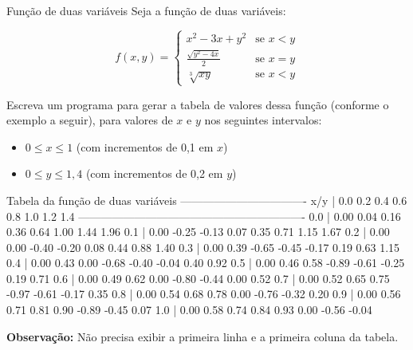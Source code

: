 \documentclass[11pt]{practice}
\begin{document}
\begin{task}[breakable]{Função de duas variáveis}{}
  Seja a função de duas variáveis:

  \[ 
  f(x,y) =
    \begin{cases}
      x^2 - 3x + y^2  & \text{se $x < y$}\\
      \frac{\sqrt{y^2 - 4x}}{2}  & \text{se $x = y$}\\
      \sqrt[3]{xy}  & \text{se $x < y$}
    \end{cases}
  \]

  Escreva um programa para gerar a tabela de valores dessa função
  (conforme o exemplo a seguir), para valores de $x$ e $y$ nos seguintes
  intervalos:
  \begin{itemize}
    \item $0 \leq x \leq 1$ (com incrementos de 0,1 em $x$)
    \item $0 \leq y \leq 1,4$ (com incrementos de 0,2 em $y$)
  \end{itemize}

  \begin{runexample}
Tabela da função de duas variáveis
----------------------------------
x/y |    0.0    0.2    0.4    0.6    0.8    1.0    1.2    1.4
-------------------------------------------------------------
0.0 |   0.00   0.04   0.16   0.36   0.64   1.00   1.44   1.96
0.1 |   0.00  -0.25  -0.13   0.07   0.35   0.71   1.15   1.67
0.2 |   0.00   0.00  -0.40  -0.20   0.08   0.44   0.88   1.40
0.3 |   0.00   0.39  -0.65  -0.45  -0.17   0.19   0.63   1.15
0.4 |   0.00   0.43   0.00  -0.68  -0.40  -0.04   0.40   0.92
0.5 |   0.00   0.46   0.58  -0.89  -0.61  -0.25   0.19   0.71
0.6 |   0.00   0.49   0.62   0.00  -0.80  -0.44   0.00   0.52
0.7 |   0.00   0.52   0.65   0.75  -0.97  -0.61  -0.17   0.35
0.8 |   0.00   0.54   0.68   0.78   0.00  -0.76  -0.32   0.20
0.9 |   0.00   0.56   0.71   0.81   0.90  -0.89  -0.45   0.07
1.0 |   0.00   0.58   0.74   0.84   0.93   0.00  -0.56  -0.04
  \end{runexample}

  \textbf{Observação:} Não precisa exibir a primeira linha e a primeira
  coluna da tabela.

  \tcblower
  \solution
\end{task}
\end{document}
